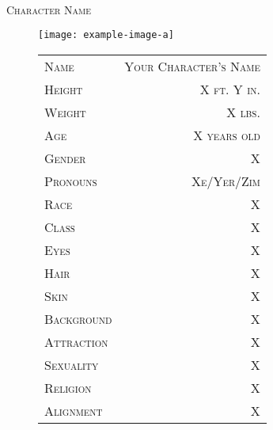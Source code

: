 \begin{center}
\HRule \\[0.4cm]
{\huge\scshape\color{maroon} Character Name}\\
\HRule
\end{center}\vspace{-1.5em}

\begin{figure}[H]
\centering
\begin{minipage}{0.48\textwidth}
\centering
\texttt{[image: example-image-a]}
\end{minipage}
\hfill
\begin{minipage}{0.48\textwidth}
\centering
\bgroup
\color{maroon}%
\begin{tabularx}{\linewidth}{|| >{\scshape}X >{\scshape}r ||}
    Name        & Your Character's Name \\
    Height      & X ft. Y in.      \\
    Weight      & X lbs.           \\
    Age         & X years old      \\
    Gender      & X \\
    Pronouns    & Xe/Yer/Zim \\
    Race        & X \\
    Class       & X \\
    Eyes        & X \\
    Hair        & X \\
    Skin        & X \\
    Background  & X \\
    Attraction  & X \\
    Sexuality   & X \\
    Religion    & X \\
    Alignment   & X \\
\end{tabularx}
\egroup
\end{minipage}
\end{figure}


